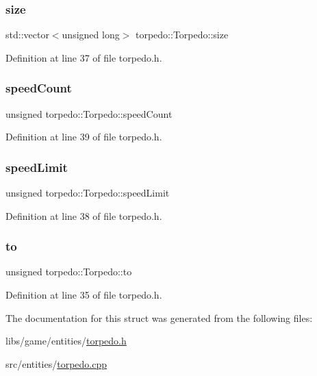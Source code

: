 \subsubsection{\texorpdfstring{size}{size}}
{\footnotesize\ttfamily std\+::vector$<$unsigned long$>$ torpedo\+::\+Torpedo\+::size}



Definition at line 37 of file torpedo.\+h.

\mbox{\label{structtorpedo_1_1_torpedo_ae4d35035e6e96d86ef270474b7624b62}} 
\subsubsection{\texorpdfstring{speed\+Count}{speedCount}}
{\footnotesize\ttfamily unsigned torpedo\+::\+Torpedo\+::speed\+Count}



Definition at line 39 of file torpedo.\+h.

\mbox{\label{structtorpedo_1_1_torpedo_aa7f3b34dce9a8062bf1fe44b5ffee0e4}} 
\subsubsection{\texorpdfstring{speed\+Limit}{speedLimit}}
{\footnotesize\ttfamily unsigned torpedo\+::\+Torpedo\+::speed\+Limit}



Definition at line 38 of file torpedo.\+h.

\mbox{\label{structtorpedo_1_1_torpedo_af0bdb753bc200365d66c10b47da0d3ea}} 
\subsubsection{\texorpdfstring{to}{to}}
{\footnotesize\ttfamily unsigned torpedo\+::\+Torpedo\+::to}



Definition at line 35 of file torpedo.\+h.



The documentation for this struct was generated from the following files\+:\begin{DoxyCompactItemize}
\item 
libs/game/entities/\hyperlink{torpedo_8h}{torpedo.\+h}\item 
src/entities/\hyperlink{torpedo_8cpp}{torpedo.\+cpp}\end{DoxyCompactItemize}
